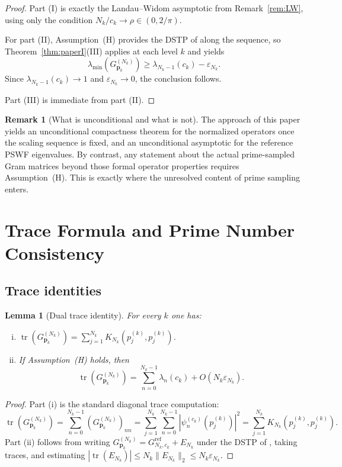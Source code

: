 \documentclass[12pt,a4paper]{amsart}
\newtheorem{lemma}[theorem]{Lemma}
\theoremstyle{definition}
\newtheorem{remark}[theorem]{Remark}
\newcommand{\GVMk}{G^{(N_k)}_{\mathbf{p}_k}}
\newcommand{\norm}[1]{\|#1\|}
\begin{document}
\begin{proof}
Part (I) is exactly the Landau--Widom asymptotic from Remark~\ref{rem:LW},
using only the condition $N_k/c_k\to\rho\in(0,2/\pi)$.

For part (II), Assumption~\textup{(H)} provides the DSTP of \cite{PaperI}
along the sequence, so Theorem~\ref{thm:paperI}(III) applies at each level $k$
and yields
\[
  \lambda_{\min}(\GVMk)
  \ge \lambda_{N_k-1}(c_k)-\varepsilon_{N_k}.
\]
Since $\lambda_{N_k-1}(c_k)\to1$ and $\varepsilon_{N_k}\to0$, the conclusion follows.

Part (III) is immediate from part (II).
\end{proof}

\begin{remark}[What is unconditional and what is not]
The approach of this paper yields an unconditional compactness theorem for the
normalized operators once the scaling sequence is fixed, and an unconditional
asymptotic for the reference PSWF eigenvalues.
By contrast, any statement about the actual prime-sampled Gram matrices beyond those
formal operator properties requires Assumption~\textup{(H)}.
This is exactly where the unresolved content of prime sampling enters.
\end{remark}

\section{Trace Formula and Prime Number Consistency}\label{sec:trace}

\subsection{Trace identities}

\begin{lemma}[Dual trace identity]\label{lem:dual_trace}
For every $k$ one has:
\begin{enumerate}[(i)]
\item $\operatorname{tr}(\GVMk)=\sum_{j=1}^{N_k}K_{N_k}(p_j^{(k)},p_j^{(k)})$.
\item If Assumption~\textup{(H)} holds, then
\[
  \operatorname{tr}(\GVMk)
  =\sum_{n=0}^{N_k-1}\lambda_n(c_k)+O(N_k\varepsilon_{N_k}).
\]
\end{enumerate}
\end{lemma}

\begin{proof}
Part (i) is the standard diagonal trace computation:
\[
  \operatorname{tr}(\GVMk)
  =\sum_{n=0}^{N_k-1}(\GVMk)_{nn}
  =\sum_{j=1}^{N_k}\sum_{n=0}^{N_k-1}|\psi_n^{(c_k)}(p_j^{(k)})|^2
  =\sum_{j=1}^{N_k}K_{N_k}(p_j^{(k)},p_j^{(k)}).
\]
Part (ii) follows from writing
$\GVMk=G^{\mathrm{ref}}_{N_k,c_k}+E_{N_k}$ under the DSTP of \cite{PaperI},
taking traces, and estimating
$|\operatorname{tr}(E_{N_k})|\le N_k\norm{E_{N_k}}_2\le N_k\varepsilon_{N_k}$.
\end{proof}
\end{document}
